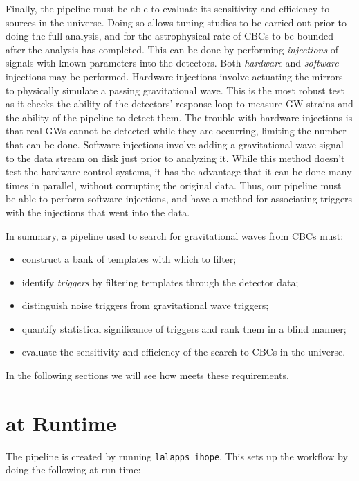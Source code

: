 Finally, the pipeline must be able to evaluate its sensitivity and efficiency
to sources in the universe. Doing so allows tuning studies to be carried out
prior to doing the full analysis, and for the astrophysical rate of \ac{CBC}s
to be bounded after the analysis has completed. This can be done by performing
\emph{injections} of signals with known parameters into the detectors. Both \emph{hardware} and \emph{software} injections may be performed. Hardware injections
involve actuating the mirrors to physically simulate a passing gravitational
wave. This is the most robust test as it checks the ability of the detectors'
response loop to measure \ac{GW} strains and the ability of the pipeline to
detect them. The trouble with hardware injections is that real \ac{GW}s cannot
be detected while they are occurring, limiting the number that can be done.
Software injections involve adding a gravitational wave signal to the data
stream on disk just prior to analyzing it. While this method doesn't test the
hardware control systems, it has the advantage that it can be done many times
in parallel, without corrupting the original data. Thus, our pipeline must be
able to perform software injections, and have a method for associating triggers
with the injections that went into the data.

In summary, a pipeline used to search for gravitational waves from \ac{CBC}s must:
\begin{itemize}
\item{construct a bank of templates with which to filter;}
\item{identify \emph{triggers} by filtering templates through the detector data;}
\item{distinguish noise triggers from gravitational wave triggers;}
\item{quantify statistical significance of triggers and rank them in a blind manner;}
\item{evaluate the sensitivity and efficiency of the search to \ac{CBC}s in the universe.}
\end{itemize}
In the following sections we will see how \ihope meets these requirements.


\section{\ihope at Runtime}
\label{sec:ihopeRuntime}

The \ihope pipeline is created by running \texttt{lalapps\_ihope}. This sets up
the workflow by doing the following at run time:

